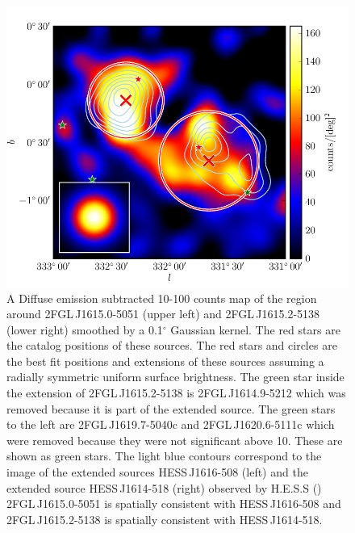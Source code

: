 \documentclass[12pt,preprint]{aastex}
\newcommand{\gev}{\text{GeV}\xspace}
\newcommand{\tev}{\text{TeV}\xspace}
\renewcommand{\deg}{\ensuremath{^\circ}\xspace}
\begin{document}
\begin{figure}
  \begin{center}
    \includegraphics[type=pdf,ext=.pdf,read=.pdf]{source_plots/source_1FGL_J1613.6-5100c}
  \end{center}
  \caption{
    A Diffuse emission subtracted 10-100
    \gev counts map of the region around 2FGL\,J1615.0-5051 (upper
    left) and 2FGL\,J1615.2-5138 (lower right) smoothed by a 0.1\deg
    Gaussian kernel.  The red stars are the catalog positions of these
    sources.  The red stars and circles are the best fit positions and
    extensions of these sources 
    assuming a radially
    symmetric uniform surface brightness.
    The green star inside the extension of 2FGL\,J1615.2-5138  is
    2FGL\,J1614.9-5212 which was removed because it is part of the
    extended source.  The green stars to the left are 2FGL\,J1619.7-5040c
    and 2FGL\,J1620.6-5111c which were removed because they were
    not significant above 10\gev. These are shown as green stars.
    The light blue
    contours correspond to the \tev image 
    of the extended sources
    HESS\,J1616-508 (left) and the extended source HESS\,J1614-518
    (right)
    observed by H.E.S.S
    (\cite{hess_plane_survey})
    2FGL\,J1615.0-5051 is spatially consistent with HESS\,J1616-508 and
    2FGL\,J1615.2-5138 is spatially consistent with HESS\,J1614-518.
  }\label{1FGL_J1613.6-5100c}
\end{figure}
\end{document}
